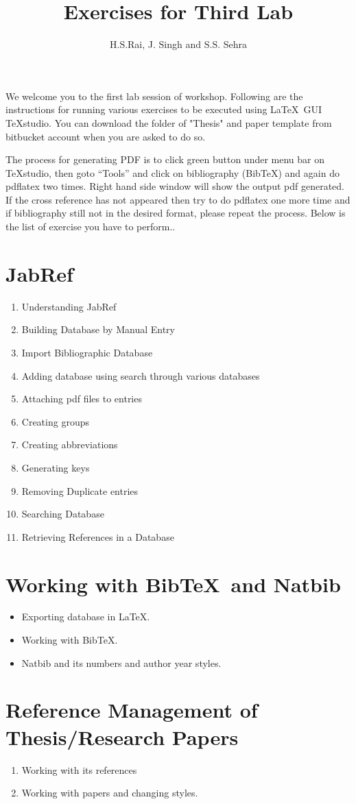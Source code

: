 \documentclass[11pt,a4paper]{article}
\author{H.S.Rai, J. Singh and S.S. Sehra}
\title{Exercises for Third Lab}
\begin{document}
\maketitle


We welcome you to the  first lab session of workshop. Following are the instructions for running various exercises to be executed using \LaTeX\ GUI \TeX studio. You can download the folder of "Thesis" and paper template from bitbucket account when you are asked to do so.

The process for generating PDF is to click green button under menu bar on \TeX studio, then goto ``Tools'' and click on bibliography (Bib\TeX) and again do pdflatex two times. Right hand side window will  show the output pdf generated. If the cross reference has not appeared then try to do pdflatex one more time and if bibliography still not in the desired format, please repeat the process. Below is the list of exercise you have to perform..

\section{JabRef}
\begin{enumerate}

\item Understanding JabRef
\item Building Database by Manual Entry 
\item Import Bibliographic Database
\item Adding database using search through various databases 
\item Attaching pdf files to entries
\item Creating groups
\item Creating abbreviations
\item Generating keys
\item Removing Duplicate entries
\item Searching Database
\item Retrieving References in a Database

\end{enumerate}

\section{Working with Bib\TeX\ and Natbib}
\begin{itemize}
\item Exporting database in \LaTeX.
\item Working with Bib\TeX.
\item Natbib and its numbers and author year styles.

\end{itemize}

\section{Reference Management of Thesis/Research Papers}
\begin{enumerate}
\item Working with its references 
\item Working with papers and changing styles. 
\end{enumerate}
\end{document}
